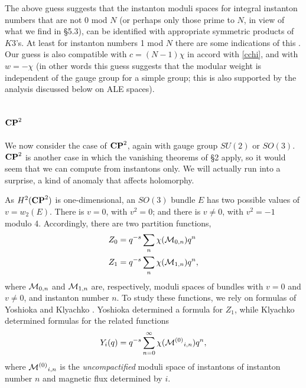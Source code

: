 \documentclass[12pt]{article}
\numberwithin{equation}{section}
\begin{document}
The above  guess suggests that the  instanton moduli spaces for integral
instanton numbers that are not 0  mod
$N$ (or perhaps only those
prime to $N$, in view of what we find in \S5.3),
can be identified with  appropriate symmetric products of $K3$'s.
At least for instanton numbers 1 mod $N$ there are some indications of
this \cite{kronh}.
Our guess is also compatible with $c=(N-1)\chi$
in accord with \eqref{cchi}, and with $w=-\chi$ (in other
  words this guess suggests that the modular weight is independent
  of the gauge group for a simple group; this is also supported
by the analysis discussed below on ALE spaces).

\subsection{\texorpdfstring{${\bf CP}^2$}{CP2}}

We now consider the case of ${\bf CP}^2$, again with gauge
group $SU(2)$ or $SO(3)$.  ${\bf CP}^2$ is  another case in which
the vanishing theorems of \S2 apply, so it would seem
that we can compute from instantons only.  We will actually run into
a surprise, a kind of anomaly that affects holomorphy.

As $H^2({\bf CP}^2)$ is one-dimensional,
an $SO(3)$ bundle $E$ has two possible values of $v=w_2(E)$.
There is $v=0$, with $v^2=0$; and there is $v\not= 0$, with $v^2=-1$ modulo 4.
Accordingly, there are two partition functions,
\begin{equation}
  \label{snln}
  \begin{aligned}Z_0& = q^{-s}\sum_{n}\chi({\cal M}_{0,n})q^n\\ Z_1 &
    = q^{-s}\sum_{n}\chi({\cal M}_{1,n})q^n,\\
  \end{aligned}
\end{equation}
where ${\cal M}_{0,n}$ and ${\cal M}_{1,n}$ are, respectively,
moduli spaces of
bundles with $v=0$ and $v\not= 0$, and instanton number $n$.
To study these functions, we rely on formulas
of Yoshioka and Klyachko \cite{yosh,klyachko}.  Yoshioka determined
a formula for $Z_1$, while Klyachko determined formulas
for the related functions
\begin{equation}
  \label{relfn}
  Y_i(q)=q^{-s}\sum_{n=0}^\infty \chi({\cal M}^{(0)}{}_{i,n})q^n,
\end{equation}
where ${\cal M}^{(0)}{}_{i,n}$ is the {\it uncompactified} moduli space
of instantons of instanton number $n$ and magnetic flux determined by $i$.
\end{document}
